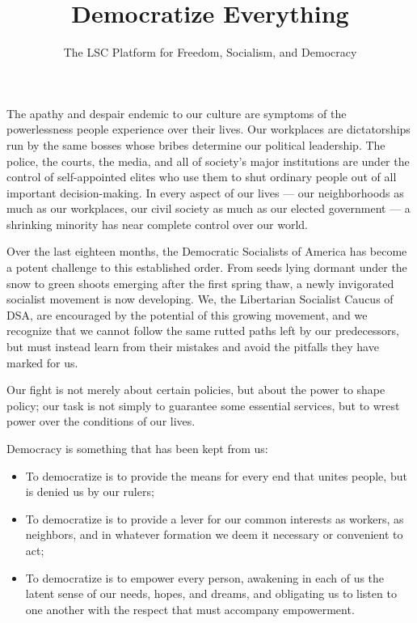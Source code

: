 \documentclass[10pt]{memoir}
\title{Democratize Everything}
\author{The LSC Platform for Freedom, Socialism, and Democracy}
\begin{document}
The apathy and despair endemic to our culture are symptoms of the powerlessness people experience over their lives. Our workplaces are dictatorships run by the same bosses whose bribes determine our political leadership. The police, the courts, the media, and all of society’s major institutions are under the control of self-appointed elites who use them to shut ordinary people out of all important decision-making. In every aspect of our lives --- our neighborhoods as much as our workplaces, our civil society as much as our elected government --- a shrinking minority has near complete control over our world.

Over the last eighteen months, the Democratic Socialists of America has become a potent challenge to this established order. From seeds lying dormant under the snow to green shoots emerging after the first spring thaw, a newly invigorated socialist movement is now developing. We, the Libertarian Socialist Caucus of DSA, are encouraged by the potential of this growing movement, and we recognize that we cannot follow the same rutted paths left by our predecessors, but must instead learn from their mistakes and avoid the pitfalls they have marked for us.

Our fight is not merely about certain policies, but about the power to shape policy; our task is not simply to guarantee some essential services, but to wrest power over the conditions of our lives. 

Democracy is something that has been kept from us: 
\begin{itemize}
\item[]{To democratize is to provide the means for every end that unites people, but is denied us by our rulers;}
\item[]{To democratize is to provide a lever for our common interests as workers, as neighbors, and in whatever formation we deem it necessary or convenient to act;}
\item[]{To democratize is to empower every person, awakening in each of us the latent sense of our needs, hopes, and dreams, and obligating us to listen to one another with the respect that must accompany empowerment.}
\end{itemize}
\end{document}
